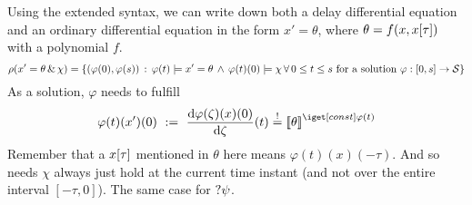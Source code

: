 
            Using the extended syntax, we can write down both a delay differential equation and an ordinary differential equation in the form $x'=\theta$, where $\theta=f(x,\xtau)$ with a polynomial $f$.
            \begin{equation}
                \rho(x'=\theta\,\&\,\chi) = \left\{
                    (\varphi(0),\varphi(s))\,:\,\varphi(t)\models x'=\theta\,\wedge\,\varphi(t)(0)\models\chi\,\forall\,0\leq t\leq s\text{ for a solution } \varphi:[0,s]\rightarrow\mathcal{S} \right\}
            \end{equation}
            As a solution, $\varphi$ needs to fulfill
            \begin{equation}
                \varphi(t)(x')(0) \defeq \DD{\varphi(\zeta)(x)(0)}{\zeta}(t) \stackrel{!}{=} \imodel[]{\varphi(t)}{\theta}
            \end{equation}
            Remember that a $\xtau$ mentioned in $\theta$ here means $\varphi(t)(x)(-\tau)$.
            And so needs $\chi$ always just hold at the current time instant (and not over the entire interval $[-\tau,0]$). The same case for $?\psi$.

